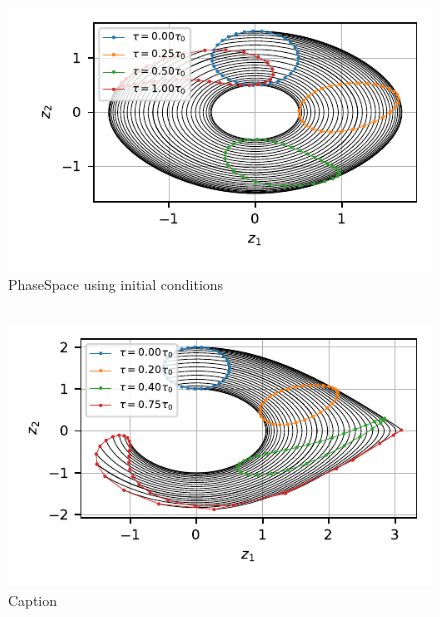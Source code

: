 \begin{figure}[h!]
    \centering
    \includegraphics{CodeAndFigures/PendulumPhaseSpaceUs2d.pdf}
    \caption{PhaseSpace using initial conditions }
    \label{fig:pend2d}
\end{figure}

\subsection{}
\begin{figure}[h!]
    \centering
    \includegraphics{CodeAndFigures/PendulumPhaseSpaceUs2e.pdf}
    \caption{Caption}
    \label{fig:pend2e}
\end{figure}

